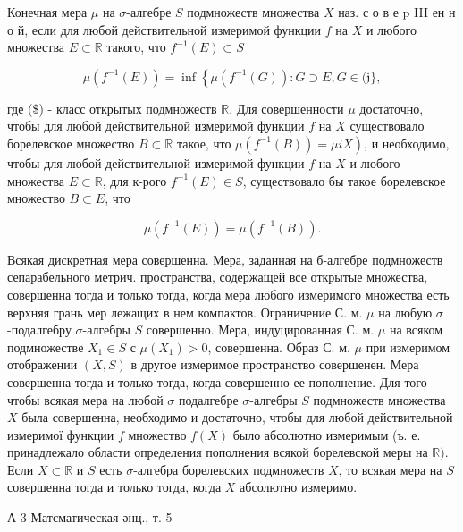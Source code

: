 \documentclass[10pt]{article}
\begin{document}
Конечная мера $\mu$ на $\sigma$-алгебре $S$ подмножеств множества $X$ наз. с о в е p III ен н о й, если для любой действительной измеримой функции $f$ на $X$ и любого множества $E \subset \mathbb{R}$ такого, что $f^{-1}(E) \subset S$



\[

\mu\left(f^{-1}(E)\right)=\inf \left\{\mu\left(f^{-1}(G)\right): G \supset E, G \in(\mathfrak{j}\},\right.

\]



где (\$) - класс открытых подмножеств $\mathbb{R}$. Для совершенности $\mu$ достаточно, чтобы для любой действительной измеримой функции $f$ на $X$ существовало борелевское множество $B \subset \mathbb{R}$ такое, что $\left.\mu\left(f^{-1}(B)\right)=\mu i X\right)$, и необходимо, чтобы для любой действительной измеримой функции $f$ на $X$ и любого множества $E \subset \mathbb{R}$, для к-рого $f^{-1}(E) \in S$, существовало бы такое борелевское множество $B \subset E$, что



\[

\mu\left(f^{-1}(E)\right)=\mu\left(f^{-1}(B)\right) .

\]



Всякая дискретная мера совершенна. Мера, заданная на б-алгебре подмножеств сепарабельного метрич. пространства, содержащей все открытые множества, совершенна тогда и только тогда, когда мера любого измеримого множества есть верхняя грань мер лежащих в нем компактов. Ограничение С. м. $\mu$ на любую $\sigma$-подалгебру $\sigma$-алгебры $S$ совершенно. Мера, индуцированная С. м. $\mu$ на всяком подмножестве $X_{1} \in S$ с $\mu\left(X_{1}\right)>0$, совершенна. Образ С. м. $\mu$ при измеримом отображении $(X, S)$ в другое измеримое пространство совершенен. Мера совершенна тогда и только тогда, когда совершенно ее пополнение. Для того чтобы всякая мера на любой $\sigma$ подалгебре $\sigma$-алгебры $S$ подмножеств множества $X$ была совершенна, необходимо и достаточно, чтобы для любой действительной измеримої функции $f$ множество $f(X)$ было абсолютно измеримым (ъ. е. принадлежало области определения пополнения всякой борелевской меры на $\mathbb{R})$. Если $X \subset \mathbb{R}$ и $S$ есть $\sigma$-алгебра борелевских подмножеств $X$, то всякая мера на $S$ совершенна тогда и только тогда, когда $X$ абсолютно измеримо.



А 3 Матсматическая әнц., т. 5
\end{document}
